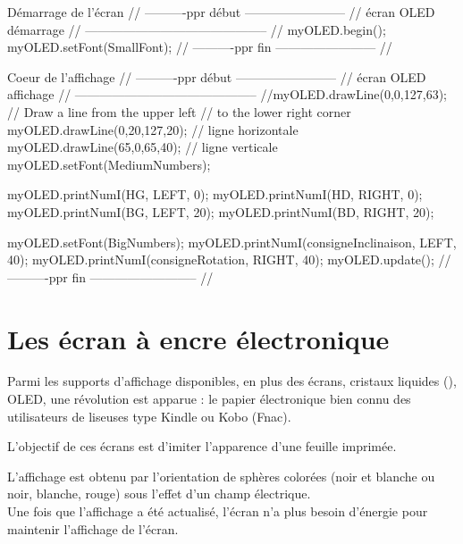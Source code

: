 \begin{Cpp}{Démarrage de l'écran}
    // 
----------ppr début ------------------------
// écran OLED démarrage
// --------------------------------------------
//
myOLED.begin();
myOLED.setFont(SmallFont);
// ----------ppr fin ------------------------
//
\end{Cpp}

\begin{Cpp}{Coeur de l'affichage}
    // ----------ppr début ------------------------
    // écran OLED affichage
    // --------------------------------------------
    //myOLED.drawLine(0,0,127,63); 
    // Draw a line from the upper left 
    // to the lower right corner
      myOLED.drawLine(0,20,127,20);  // ligne horizontale 
      myOLED.drawLine(65,0,65,40);   // ligne verticale
      myOLED.setFont(MediumNumbers);      
  
      myOLED.printNumI(HG, LEFT, 0);
      myOLED.printNumI(HD, RIGHT, 0);
      myOLED.printNumI(BG, LEFT, 20);
      myOLED.printNumI(BD, RIGHT, 20);
  
      myOLED.setFont(BigNumbers);
      myOLED.printNumI(consigneInclinaison, LEFT, 40);
      myOLED.printNumI(consigneRotation, RIGHT, 40);
      myOLED.update();
    // ----------ppr fin --------------------------
    //
  
\end{Cpp}



\chapter{Les écran à encre électronique}

Parmi les supports d'affichage disponibles, en plus des écrans, cristaux liquides 
(), OLED, une révolution est apparue : le papier électronique  
bien connu des utilisateurs de liseuses type Kindle ou Kobo (Fnac).

L'objectif de ces écrans est d'imiter l'apparence d'une feuille imprimée.\\



L'affichage est obtenu par l'orientation de sphères colorées (noir et blanche ou noir, blanche, rouge) sous l'effet d'un champ électrique.\\ 
Une fois que l'affichage a été actualisé, l'écran n'a plus besoin d'énergie pour maintenir l'affichage de l'écran.

